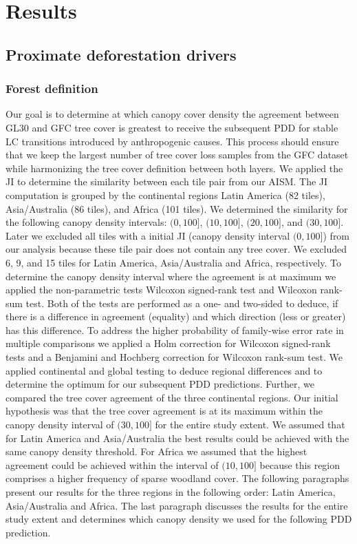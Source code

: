 \chapter{Results}
\label{ch:results}
	\section{Proximate deforestation drivers}
	\label{sec:results_deforestation}

		\subsection{Forest definition}
		\label{subsec:results_forest_definition}
			Our goal is to determine at which canopy cover density the agreement between \ac{GL30} and \ac{GFC} tree cover is greatest to receive the subsequent \ac{PDD} for stable \ac{LC} transitions introduced by anthropogenic causes. This process should ensure that we keep the largest number of tree cover loss samples from the \ac{GFC} dataset while harmonizing the tree cover definition between both layers. We applied the \ac{JI} to determine the similarity between each tile pair from our \ac{AISM}. The \ac{JI} computation is grouped by the continental regions Latin America (82 tiles), Asia/Australia (86 tiles), and Africa (101 tiles). We determined the similarity for the following canopy density intervals: $(0, 100]$, $(10, 100]$, $(20, 100]$, and $(30, 100]$. Later we excluded all tiles with a initial \ac{JI} (canopy density interval $(0,100]$) from our analysis because these tile pair does not contain any tree cover. We excluded 6, 9, and 15 tiles for Latin America, Asia/Australia and Africa, respectively. To determine the canopy density interval where the agreement is at maximum we applied the non-parametric tests Wilcoxon signed-rank test and Wilcoxon rank-sum test. Both of the tests are performed as a one- and two-sided to deduce, if there is a difference in agreement (equality) and which direction (less or greater) has this difference. To address the higher probability of family-wise error rate in multiple comparisons we applied a Holm correction for Wilcoxon signed-rank tests and a Benjamini and Hochberg correction for Wilcoxon rank-sum test. We applied continental and global testing to deduce regional differences and to determine the optimum for our subsequent \ac{PDD} predictions. Further, we compared the tree cover agreement of the three continental regions. Our initial hypothesis was that the tree cover agreement is at its maximum within the canopy density interval of $(30,100]$ for the entire study extent. We assumed that for Latin America and Asia/Australia the best results could be achieved with the same canopy density threshold. For Africa we assumed that the highest agreement could be achieved within the interval of $(10,100]$ because this region comprises a higher frequency of sparse woodland cover. The following paragraphs present our results for the three regions in the following order: Latin America, Asia/Australia and Africa. The last paragraph discusses the results for the entire study extent and determines which canopy density we used for the following \ac{PDD} prediction.

